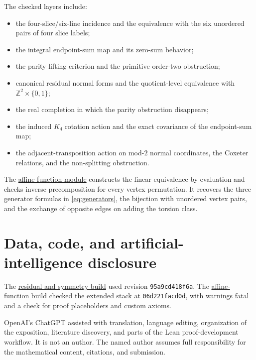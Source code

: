 \documentclass[11pt]{amsart}
\theoremstyle{definition}
\theoremstyle{remark}
\newcommand{\Z}{\mathbb Z}
\begin{document}
The checked layers include:
\begin{itemize}[leftmargin=2em]
\item the four-slice/six-line incidence and the equivalence with the six unordered pairs of four slice labels;
\item the integral endpoint-sum map and its zero-sum behavior;
\item the parity lifting criterion and the primitive order-two obstruction;
\item canonical residual normal forms and the quotient-level equivalence with $\Z^2\times\{0,1\}$;
\item the real completion in which the parity obstruction disappears;
\item the induced $K_4$ rotation action and the exact covariance of the endpoint-sum map;
\item the adjacent-transposition action on mod-$2$ normal coordinates, the Coxeter relations, and the non-splitting obstruction.
\end{itemize}

The \href{https://github.com/awdawmip/enterprise-math/blob/06d221facd0d0323dc1b08e13422b500a0eaa8cd/EnterpriseMath/PrecisionPi/PaperIIAffineFunctions.lean}{affine-function module} constructs the linear equivalence by evaluation and checks inverse precomposition for every vertex permutation. It recovers the three generator formulas in \cref{eq:generators}, the bijection with unordered vertex pairs, and the exchange of opposite edges on adding the torsion class.

\section*{Data, code, and artificial-intelligence disclosure}

The \href{https://github.com/awdawmip/enterprise-math/actions/runs/33657478048}{residual and symmetry build} used revision \texttt{95a9cd418f6a}. The \href{https://github.com/awdawmip/enterprise-math/actions/runs/43376204148/job/131723174697}{affine-function build} checked the extended stack at \texttt{06d221facd0d}, with warnings fatal and a check for proof placeholders and custom axioms.

OpenAI's ChatGPT assisted with translation, language editing, organization of the exposition, literature discovery, and parts of the Lean proof-development workflow. It is not an author. The named author assumes full responsibility for the mathematical content, citations, and submission.
\end{document}
